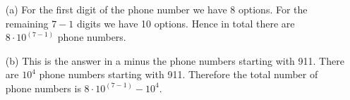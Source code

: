 

\setcounter{theorem}{1}
\begin{exercise}[BH.1.2]
	\begin{solution}
	\begin{enumerate}
	\item[(a)]  For the first digit of the phone number we have 8 options. For the remaining $7-1$ digits we have 10 options. Hence in total there are $8\cdot 10^{(7-1)}$ phone numbers.  
	\item[(b)] This is the answer in a minus the phone numbers starting with 911. There are $10^4$ phone numbers starting with 911. Therefore the total number of phone numbers is $8\cdot 10^{(7-1)}-10^4$. 
\end{enumerate} 
	\end{solution}
\end{exercise}



